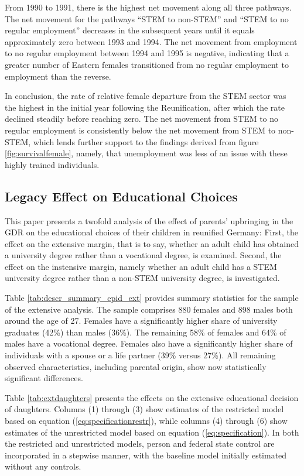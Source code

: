 \documentclass[a4paper, oneside, hyperfootnotes = false]{article}
\begin{document}
{From 1990 to 1991, there is the highest net movement along all three pathways.
The net movement for the pathways ``STEM to non-STEM'' and ``STEM to no regular employment'' decreases in the subsequent years until it equals approximately zero between 1993 and 1994.
The net movement from employment to no regular employment between 1994 and 1995 is negative, indicating that a greater number of Eastern females transitioned from no regular employment to employment than the reverse.

In conclusion, the rate of relative female departure from the STEM sector was the highest in the initial year following the Reunification, after which the rate declined steadily before reaching zero.
The net movement from STEM to no regular employment is consistently below the net movement from STEM to non-STEM, which lends further support to the findings derived from figure \ref{fig:survivalfemale}, namely, that unemployment was less of an issue with these highly trained individuals.

\subsection{Legacy Effect on Educational Choices}
\label{educational}

This paper presents a twofold analysis of the effect of parents' upbringing in the GDR on the educational choices of their children in reunified Germany:
First, the effect on the extensive margin, that is to say, whether an adult child has obtained a university degree rather than a vocational degree, is examined.
Second, the effect on the instensive margin, namely whether an adult child has a STEM university degree rather than a non-STEM university degree, is investigated.

Table \ref{tab:descr_summary_epid_ext} provides summary statistics for the sample of the extensive analysis.
The sample comprises 880 females and 898 males both around the age of 27.
Females have a significantly higher share of university graduates (42\%) than males (36\%).
The remaining 58\% of females and 64\% of males have a vocational degree.
Females also have a significantly higher share of individuals with a spouse or a life partner (39\% versus 27\%).
All remaining observed characteristics, including parental origin, show now statistically significant differences.

Table \ref{tab:extdaughters} presents the effects on the extensive educational decision of daughters.
Columns (1) through (3) show estimates of the restricted model based on equation (\ref{eq:specificationrestr}), while columns (4) through (6) show estimates of the unrestricted model based on equation (\ref{eq:specification}).
In both the restricted and unrestricted models, person and federal state control are incorporated in a stepwise manner, with the baseline model initially estimated without any controls.

}
\end{document}
